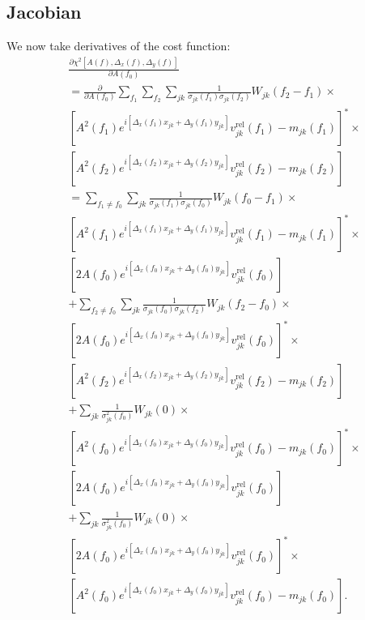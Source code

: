 \documentclass{article}
\begin{document}
\subsection{Jacobian}

We now take derivatives of the cost function:
\begin{equation}
\begin{split}
    &\frac{\partial \chi^2[A(f), \Delta_x(f), \Delta_y(f)]}{\partial A(f_0)} \\
    & = \frac{\partial}{\partial A(f_0)} \sum_{f_1} \sum_{f_2} \sum_{jk} \frac{1}{\sigma_{jk}(f_1)\sigma_{jk}(f_2)} W_{jk}(f_2-f_1) \times \\
    & \left[ A^2(f_1) e^{i[\Delta_x(f_1) x_{jk} + \Delta_y(f_1) y_{jk}]} v^\text{rel}_{jk}(f_1) - m_{jk}(f_1) \right]^* \times \\
    & \left[ A^2(f_2) e^{i[\Delta_x(f_2) x_{jk} + \Delta_y(f_2) y_{jk}]} v^\text{rel}_{jk}(f_2) - m_{jk}(f_2) \right] \\
    & = \sum_{f_1 \neq f_0} \sum_{jk} \frac{1}{\sigma_{jk}(f_1)\sigma_{jk}(f_0)} W_{jk}(f_0-f_1) \times \\
    & \left[ A^2(f_1) e^{i[\Delta_x(f_1) x_{jk} + \Delta_y(f_1) y_{jk}]} v^\text{rel}_{jk}(f_1) - m_{jk}(f_1) \right]^* \times \\
    & \left[ 2 A(f_0) e^{i[\Delta_x(f_0) x_{jk} + \Delta_y(f_0) y_{jk}]} v^\text{rel}_{jk}(f_0) \right] \\
    & + \sum_{f_2 \neq f_0} \sum_{jk} \frac{1}{\sigma_{jk}(f_0)\sigma_{jk}(f_2)} W_{jk}(f_2-f_0) \times \\
    & \left[ 2 A(f_0) e^{i[\Delta_x(f_0) x_{jk} + \Delta_y(f_0) y_{jk}]} v^\text{rel}_{jk}(f_0) \right]^* \times \\
    & \left[ A^2(f_2) e^{i[\Delta_x(f_2) x_{jk} + \Delta_y(f_2) y_{jk}]} v^\text{rel}_{jk}(f_2) - m_{jk}(f_2) \right] \\
    & + \sum_{jk} \frac{1}{\sigma^2_{jk}(f_0)} W_{jk}(0) \times \\
    & \left[ A^2(f_0) e^{i[\Delta_x(f_0) x_{jk} + \Delta_y(f_0) y_{jk}]} v^\text{rel}_{jk}(f_0) - m_{jk}(f_0) \right]^* \times \\
    & \left[ 2 A(f_0) e^{i[\Delta_x(f_0) x_{jk} + \Delta_y(f_0) y_{jk}]} v^\text{rel}_{jk}(f_0) \right] \\
    & + \sum_{jk} \frac{1}{\sigma^2_{jk}(f_0)} W_{jk}(0) \times \\
    & \left[ 2 A(f_0) e^{i[\Delta_x(f_0) x_{jk} + \Delta_y(f_0) y_{jk}]} v^\text{rel}_{jk}(f_0) \right]^* \times \\
    & \left[ A^2(f_0) e^{i[\Delta_x(f_0) x_{jk} + \Delta_y(f_0) y_{jk}]} v^\text{rel}_{jk}(f_0) - m_{jk}(f_0) \right]. \\
\end{split}
\end{equation}
\end{document}
